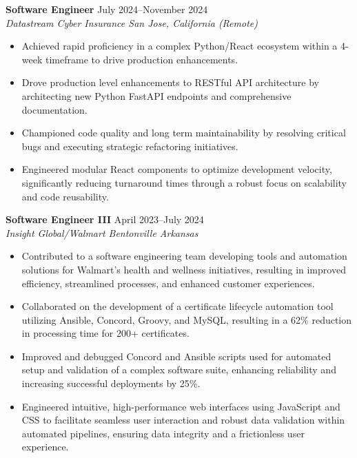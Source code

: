 \documentclass[10pt,a4paper]{article}
\begin{document}
\noindent\textbf{Software Engineer} \hfill July 2024--November 2024 \\
\textit{Datastream Cyber Insurance \textbar{} San Jose, California (Remote)}
\begin{itemize}[leftmargin=*, noitemsep, topsep=0pt]
    \item Achieved rapid proficiency in a complex Python/React ecosystem within a 4-week timeframe to drive production enhancements.
    \item Drove production level enhancements to RESTful API architecture by architecting new Python FastAPI endpoints and comprehensive documentation.
    \item Championed code quality and long term maintainability by resolving critical bugs and executing strategic refactoring initiatives.
    \item Engineered modular React components to optimize development velocity, significantly reducing turnaround times through a robust focus on scalability and code reusability.
\end{itemize}
\vspace{2mm}

\noindent\textbf{Software Engineer III} \hfill April 2023--July 2024 \\
\textit{Insight Global/Walmart \textbar{} Bentonville Arkansas}
\begin{itemize}[leftmargin=*, noitemsep, topsep=0pt]
    \item Contributed to a software engineering team developing tools and automation solutions for Walmart's health and wellness initiatives, resulting in improved efficiency, streamlined processes, and enhanced customer experiences.
    \item Collaborated on the development of a certificate lifecycle automation tool utilizing Ansible, Concord, Groovy, and MySQL, resulting in a 62\% reduction in processing time for 200+ certificates.
    \item Improved and debugged Concord and Ansible scripts used for automated setup and validation of a complex software suite, enhancing reliability and increasing successful deployments by 25\%.
    \item Engineered intuitive, high-performance web interfaces using JavaScript and CSS to facilitate seamless user interaction and robust data validation within automated pipelines, ensuring data integrity and a frictionless user experience.
\end{itemize}
\vspace{2mm}
\end{document}
